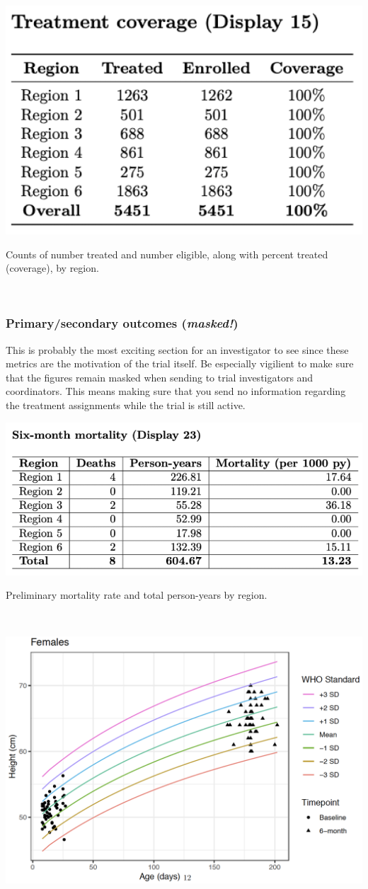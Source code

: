 \documentclass[
]{book}
\begin{document}
\includegraphics[width=0.4\linewidth,height=0.2\textheight]{images/report-images/treatment}

Counts of number treated and number eligible, along with percent treated (coverage), by region.

\(~\)

\subsubsection{\texorpdfstring{Primary/secondary outcomes (\textbf{\emph{masked!}})}{Primary/secondary outcomes (masked!)}}\label{primarysecondary-outcomes-masked}

This is probably the most exciting section for an investigator to see since these metrics are the motivation of the trial itself. Be especially vigilient to make sure that the figures remain masked when sending to trial investigators and coordinators. This means making sure that you send no information regarding the treatment assignments while the trial is still active.

\includegraphics[width=0.5\linewidth,height=0.35\textheight]{images/report-images/primary_outcome}

Preliminary mortality rate and total person-years by region.

\(~\)

\includegraphics[width=0.5\linewidth,height=0.4\textheight]{images/report-images/growth_curves}
\end{document}
